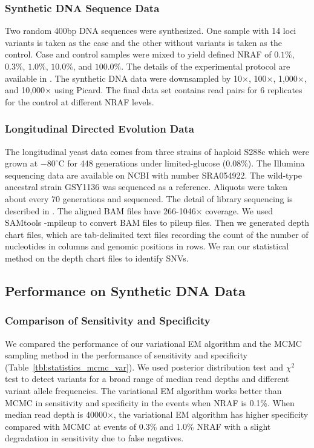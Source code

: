 \documentclass[11pt,reqno]{amsart}
\begin{document}
\subsubsection{Synthetic DNA Sequence Data}
Two random 400bp DNA sequences were synthesized. One sample with 14 loci variants is taken as the case and the other without variants is taken as the control.
Case and control samples were mixed to yield defined NRAF of $0.1\%$, $0.3\%$, $1.0\%$, $10.0\%$, and $100.0\%$.
The details of the experimental protocol are available in \citep{flaherty2011ultrasensitive}.
The synthetic DNA data were downsampled by 10$\times$, 100$\times$, 1,000$\times$, and 10,000$\times$ using Picard.
The final data set contains read pairs for 6 replicates for the control at different NRAF levels.

\subsubsection{Longitudinal Directed Evolution Data}
The longitudinal yeast data comes from three strains of haploid S288c which were grown at $-80^{\circ }\textrm{C}$ for 448 generations under limited-glucose (0.08$\%$).
The Illumina sequencing data are available on NCBI with number SRA054922.
The wild-type ancestral strain GSY1136 was sequenced as a reference.
Aliquots were taken about every 70 generations and sequenced.
The detail of library sequencing is described in \citep{kvitek2013whole, kao2008molecular}.
The aligned BAM files have 266-1046$\times$ coverage.
We used SAMtools -mpileup to convert BAM files to pileup files.
Then we generated depth chart files, which are tab-delimited text files recording the count of the number of nucleotides in columns and genomic positions in rows.
We ran our statistical method on the depth chart files to identify SNVs.

\subsection{Performance on Synthetic DNA Data}
\subsubsection{Comparison of Sensitivity and Specificity}
We compared the performance of our variational EM algorithm and the MCMC sampling method in the performance of sensitivity and specificity (Table~\ref{tbl:statistics_mcmc_var}).
We used posterior distribution test and $\chi^2$ test to detect variants for a broad range of median read depths and different variant allele frequencies.
The variational EM algorithm works better than MCMC in sensitivity and specificity in the events when NRAF is 0.1\%.
When median read depth is 40000$\times$, the variational EM algorithm has higher specificity compared with MCMC at events of 0.3\% and 1.0\% NRAF with a slight degradation in sensitivity due to false negatives.
\end{document}
